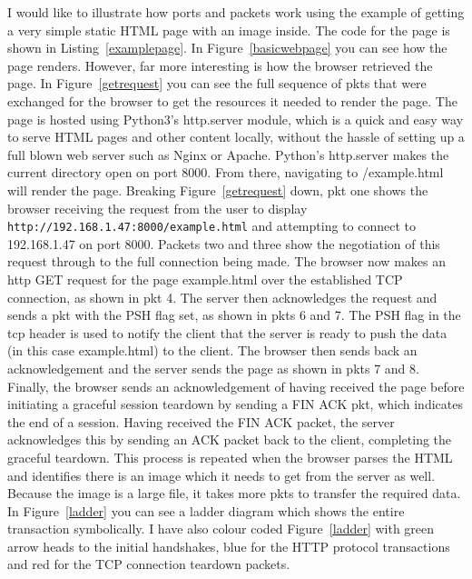 \documentclass[titlepage]{article}
\begin{document}
I would like to illustrate how ports and packets work using the example of getting a very simple
static HTML page with an image inside.
The code for the page is shown in Listing~\ref{examplepage}.
In Figure~\ref{basicwebpage} you can see how the page renders.
However, far more interesting is how the browser retrieved the page. In Figure~\ref{getrequest}
you can see the full sequence of \glspl{pkt} that were exchanged for the 
browser to get the resources it needed to render the page. The page is hosted using Python3's 
http.server module, which is a quick and easy way to serve HTML pages and other content locally,
without the hassle of setting up a full blown web server such as Nginx or Apache.
Python's http.server makes the current directory open on port 8000\cite{python:httpserver}.
From there, navigating to /example.html will render the page.
Breaking Figure~\ref{getrequest} down, \gls{pkt} one shows the browser receiving the request from the user to 
display \verb|http://192.168.1.47:8000/example.html| and attempting to connect to 192.168.1.47 on 
port 8000. Packets two and three show the negotiation of this request through to the full connection 
being made. The browser now makes an \gls{http} GET request for the page example.html over the 
established TCP connection, as shown in \gls{pkt} 4. The server then acknowledges the request and 
sends a \gls{pkt} with the PSH flag set, as shown in \glspl{pkt} 6 and 7.
The PSH flag in the \gls{tcp} header is used to notify the client that the server is ready to
push the data (in this case example.html) to the client\cite{wiki:tcp}.
The browser then sends back an acknowledgement and the server sends the page as shown in \glspl{pkt} 7 and 8. 
Finally, the browser sends an acknowledgement of having received the page before initiating a 
graceful session teardown by sending a FIN ACK \gls{pkt}, which indicates the end of a session\cite{rfc:tcp}.
Having received the FIN ACK packet, the server acknowledges this by sending an ACK packet back
to the client, completing the graceful teardown.
This process is repeated when the browser parses the HTML and identifies there is an image which it needs to 
get from the server as well. Because the image is a large file, it takes more \glspl{pkt} to
transfer the required data.
In Figure~\ref{ladder} you can see a ladder diagram which shows the entire transaction symbolically.
I have also colour coded Figure~\ref{ladder} with green arrow heads to the initial handshakes,
blue for the HTTP protocol transactions and red for the TCP connection teardown packets.
\end{document}
